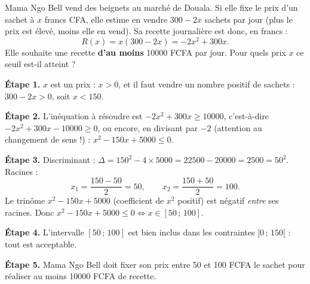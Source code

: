 \documentclass[11pt]{article}
\begin{document}
\begin{exemplebox}
Mama Ngo Bell vend des beignets au marché de Douala. Si elle fixe le prix d'un sachet à $x$ francs CFA, elle estime en vendre $300 - 2x$ sachets par jour (plus le prix est élevé, moins elle en vend). Sa recette journalière est donc, en francs :
\[ R(x) = x(300 - 2x) = -2x^2 + 300x. \]
Elle souhaite une recette \textbf{d'au moins} \num{10000} FCFA par jour. Pour quels prix $x$ ce seuil est-il atteint ?

\textbf{Étape 1.} $x$ est un prix : $x > 0$, et il faut vendre un nombre positif de sachets : $300 - 2x > 0$, soit $x < 150$.

\textbf{Étape 2.} L'inéquation à résoudre est $-2x^2 + 300x \geq \num{10000}$, c'est-à-dire $-2x^2 + 300x - \num{10000} \geq 0$, ou encore, en divisant par $-2$ (attention au changement de sens !) : $x^2 - 150x + \num{5000} \leq 0$.

\textbf{Étape 3.} Discriminant : $\Delta = 150^2 - 4 \times \num{5000} = \num{22500} - \num{20000} = \num{2500} = 50^2$. Racines :
\[ x_1 = \frac{150 - 50}{2} = 50, \qquad x_2 = \frac{150 + 50}{2} = 100. \]
Le trinôme $x^2 - 150x + \num{5000}$ (coefficient de $x^2$ positif) est négatif \emph{entre} ses racines. Donc $x^2 - 150x + \num{5000} \leq 0 \iff x \in [50\,;\,100]$.

\textbf{Étape 4.} L'intervalle $[50\,;\,100]$ est bien inclus dans les contraintes $]0\,;\,150[$ : tout est acceptable.

\textbf{Étape 5.} Mama Ngo Bell doit fixer son prix entre \num{50} et \num{100} FCFA le sachet pour réaliser au moins \num{10000} FCFA de recette.
\end{exemplebox}
\end{document}
